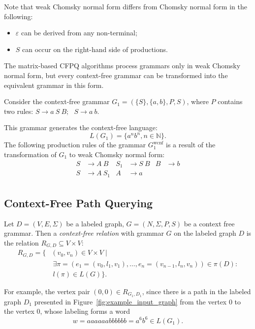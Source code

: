 Note that weak Chomsky normal form differs from Chomsky normal form in the following:
\begin{itemize}
    \item $\varepsilon$ can be derived from any non-terminal;
    \item $S$ can occur on the right-hand side of productions.
\end{itemize}

The matrix-based CFPQ algorithms process grammars only in weak Chomsky normal form, but every context-free grammar can be transformed into the equivalent grammar in this form.

Consider the context-free grammar $G_1=(\{S\},\{a, b\}, P, S)$, where $P$ contains two rules:
$S \rightarrow a \ S \ B; \ \ \ 
S \rightarrow a \ b
$.

This grammar generates the context-free language: $$L(G_1) = \{a^nb^n, n \in \mathbb{N}\}.$$
The following production rules of the grammar $G_1^{\text{wcnf}}$ is a result of the transformation of $G_1$ to weak Chomsky normal form:
\begin{align*}
S& \to A \ B   & S_1& \to S \ B   & B& \to b  \\
S& \to A \ S_1 & A& \to a &&  \\
\end{align*}


\subsection{Context-Free Path Querying}

\begin{definition}
Let $D = (V, E, \Sigma)$ be a labeled graph, $G = (N, \Sigma, P, S)$ be a context free grammar. Then a \emph{context-free relation} with grammar $G$ on the labeled graph $D$ is the relation $R_{G, D} \subseteq V \times V$:
\begin{equation*} \label{eq1}
\begin{split}
R_{G, D} = \{ &(v_0, v_n) \in V \times V  \mid \\ &\ \exists \pi = (e_1 = (v_0, l_1, v_1), \ldots, e_n = (v_{n-1}, l_n, v_n)) \in \pi(D): \\
      &\ l(\pi) \in L(G) \}.
\end{split}
\end{equation*}
\end{definition}

For example, the vertex pair $(0,0) \in R_{G_1, D_1}$, since there is a path in the labeled graph $D_1$ presented in Figure~\ref{fig:example_input_graph} from the vertex $0$ to the vertex $0$, whose labeling forms a word $$w = aaaaaabbbbbb = a^6b^6 \in L(G_1).$$

